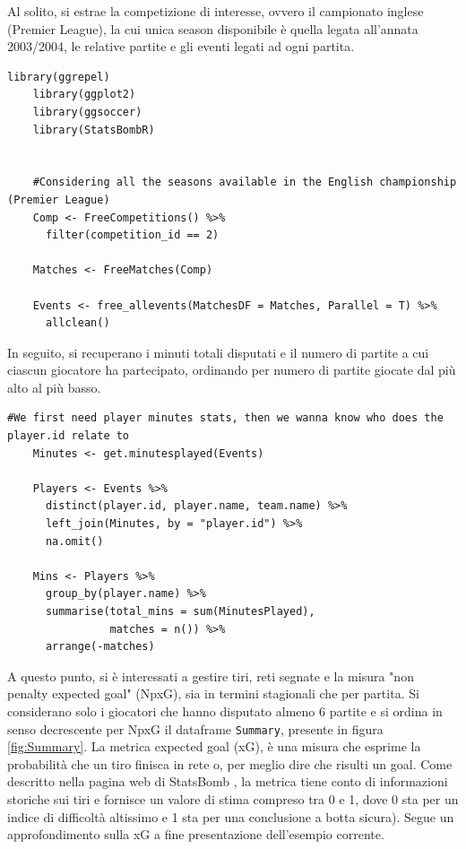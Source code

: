             Al solito, si estrae la competizione di interesse, ovvero il campionato inglese (Premier League), la cui unica season disponibile è quella legata all'annata 2003/2004, le relative partite e gli eventi legati ad ogni partita.

            \vspace{10pt}

            \begin{lstlisting}[numbers=None]
    library(ggrepel)
    library(ggplot2)
    library(ggsoccer)
    library(StatsBombR)
    
    
    #Considering all the seasons available in the English championship (Premier League)
    Comp <- FreeCompetitions() %>%
      filter(competition_id == 2)
    
    Matches <- FreeMatches(Comp)
    
    Events <- free_allevents(MatchesDF = Matches, Parallel = T) %>% 
      allclean()
            \end{lstlisting}

            \vspace{10pt}
            
            In seguito, si recuperano i minuti totali disputati e il numero di partite a cui ciascun giocatore ha partecipato, ordinando per numero di partite giocate dal più alto al più basso. 

            \vspace{10pt}
        
            \begin{lstlisting}[numbers=None]
    #We first need player minutes stats, then we wanna know who does the player.id relate to
    Minutes <- get.minutesplayed(Events)
    
    Players <- Events %>% 
      distinct(player.id, player.name, team.name) %>% 
      left_join(Minutes, by = "player.id") %>% 
      na.omit()
    
    Mins <- Players %>%
      group_by(player.name) %>% 
      summarise(total_mins = sum(MinutesPlayed),
                matches = n()) %>%
      arrange(-matches)    
            \end{lstlisting}

            \vspace{10pt}

            A questo punto, si è interessati a gestire tiri, reti segnate e la misura "non penalty expected goal" (NpxG), sia in termini stagionali che per partita. Si considerano solo i giocatori che hanno disputato almeno 6 partite e si ordina in senso decrescente per NpxG il dataframe \texttt{Summary}, presente in figura \ref{fig:Summary}. La metrica expected goal (xG), è una misura che esprime la probabilità che un tiro finisca in rete o, per meglio dire che risulti un goal. Come descritto nella pagina web di StatsBomb \cite{xG}, la metrica tiene conto di informazioni storiche sui tiri e fornisce un valore di stima compreso tra 0 e 1, dove 0 sta per un indice di difficoltà altissimo e 1 sta per una conclusione a botta sicura). Segue un approfondimento sulla xG a fine presentazione dell'esempio corrente.
            
